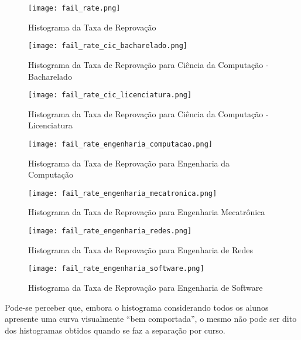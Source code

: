 \begin{figure}[!ht]
    \caption{Histograma da Taxa de Reprovação}
    \centering
    \texttt{[image: fail\_rate.png]}
    \label{fail_rate_all}
\end{figure}

\begin{figure}[!ht]
    \caption{Histograma da Taxa de Reprovação para Ciência da Computação - Bacharelado}
    \centering
    \texttt{[image: fail\_rate\_cic\_bacharelado.png]}
    \label{fail_rate_cic_b}
\end{figure}

\begin{figure}[!ht]
    \caption{Histograma da Taxa de Reprovação para Ciência da Computação -
    Licenciatura}
    \centering
    \texttt{[image: fail\_rate\_cic\_licenciatura.png]}
    \label{fail_rate_cic_lic}
\end{figure}

\begin{figure}[!ht]
    \caption{Histograma da Taxa de Reprovação para Engenharia da Computação}
    \centering
    \texttt{[image: fail\_rate\_engenharia\_computacao.png]}
    \label{fail_rate_eng_comp}
\end{figure}

\begin{figure}[!ht]
    \caption{Histograma da Taxa de Reprovação para Engenharia Mecatrônica}
    \centering
    \texttt{[image: fail\_rate\_engenharia\_mecatronica.png]}
    \label{fail_rate_eng_mectr}
\end{figure}

\begin{figure}[!ht]
    \caption{Histograma da Taxa de Reprovação para Engenharia de Redes}
    \centering
    \texttt{[image: fail\_rate\_engenharia\_redes.png]}
    \label{fail_rate_eng_redes}
\end{figure}

\begin{figure}[!ht]
    \caption{Histograma da Taxa de Reprovação para Engenharia de Software}
    \centering
    \texttt{[image: fail\_rate\_engenharia\_software.png]}
    \label{fail_rate_eng_soft}
\end{figure}

Pode-se perceber que, embora o histograma considerando todos os alunos apresente uma
curva visualmente ``bem comportada'', o mesmo não pode ser dito dos histogramas
obtidos
quando se faz a separação por curso.  

